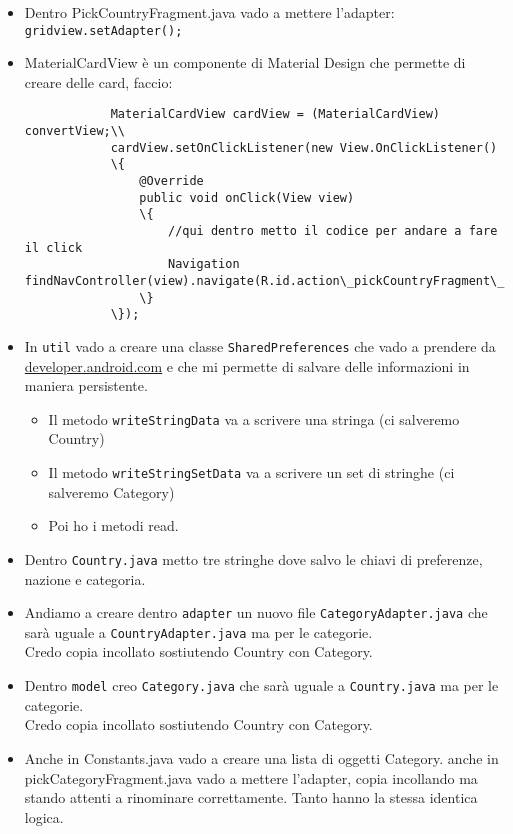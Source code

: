 \begin{itemize}
\begin{itemize}
        \item Dentro PickCountryFragment.java vado a mettere l'adapter: \texttt{gridview.setAdapter();}
        \item MaterialCardView è un componente di Material Design che permette di creare delle card, faccio:\\
        \begin{verbatim}
            MaterialCardView cardView = (MaterialCardView) convertView;\\
            cardView.setOnClickListener(new View.OnClickListener() 
            \{
                @Override
                public void onClick(View view) 
                \{
                    //qui dentro metto il codice per andare a fare il click
                    Navigation findNavController(view).navigate(R.id.action\_pickCountryFragment\_to\_pickCategoryFragment);
                \}
            \});
        \end{verbatim}
        \item In \texttt{util} vado a creare una classe \texttt{SharedPreferences} che vado a prendere da \url{developer.android.com} e che mi permette di salvare delle informazioni in maniera persistente.
        \begin{itemize}
            \item Il metodo \texttt{writeStringData} va a scrivere una stringa (ci salveremo Country)
            \item Il metodo \texttt{writeStringSetData} va a scrivere un set di stringhe (ci salveremo Category)
            \item Poi ho i metodi read.
        \end{itemize}
        \item Dentro \texttt{Country.java} metto tre stringhe dove salvo le chiavi di preferenze, nazione e categoria.
        \item Andiamo a creare dentro \texttt{adapter} un nuovo file \texttt{CategoryAdapter.java} che sarà uguale a \texttt{CountryAdapter.java} ma per le categorie.\\
        Credo copia incollato sostiutendo Country con Category.
        \item Dentro \texttt{model} creo \texttt{Category.java} che sarà uguale a \texttt{Country.java} ma per le categorie.\\
        Credo copia incollato sostiutendo Country con Category.
        \item Anche in Constants.java vado a creare una lista di oggetti Category. anche in pickCategoryFragment.java vado a mettere l'adapter, copia incollando ma stando attenti a rinominare correttamente. Tanto hanno la stessa identica logica.

\end{itemize}
\end{itemize}
